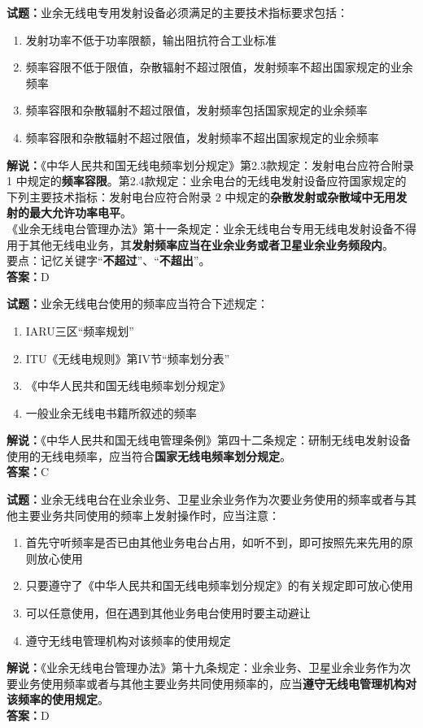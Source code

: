 \documentclass{ctexbook}
\begin{document}
\bigskip

\noindent\textbf{试题：}业余无线电专用发射设备必须满足的主要技术指标要求包括：
\begin{enumerate}[leftmargin=3em]
  \item 发射功率不低于功率限额，输出阻抗符合工业标准
  \item 频率容限不低于限值，杂散辐射不超过限值，发射频率不超出国家规定的业余频率
  \item 频率容限和杂散辐射不超过限值，发射频率包括国家规定的业余频率
  \item 频率容限和杂散辐射不超过限值，发射频率不超出国家规定的业余频率
\end{enumerate}
\noindent\textbf{解说：}《中华人民共和国无线电频率划分规定》第2.3款规定：发射电台应符合附录 1 中规定的\textbf{频率容限}。第2.4款规定：业余电台的无线电发射设备应符国家规定的下列主要技术指标：发射电台应符合附录 2 中规定的\textbf{杂散发射或杂散域中无用发射的最大允许功率电平}。\\《业余无线电台管理办法》第十一条规定：业余无线电台专用无线电发射设备不得用于其他无线电业务，其\textbf{发射频率应当在业余业务或者卫星业余业务频段内}。\\要点：记忆关键字“\textbf{不超过}”、“\textbf{不超出}”。\\\noindent\textbf{答案：}D

\bigskip

\noindent\textbf{试题：}业余无线电台使用的频率应当符合下述规定：
\begin{enumerate}[leftmargin=3em]
  \item IARU三区“频率规划”
  \item ITU《无线电规则》第IV节“频率划分表”
  \item 《中华人民共和国无线电频率划分规定》
  \item 一般业余无线电书籍所叙述的频率
\end{enumerate}
\noindent\textbf{解说：}《中华人民共和国无线电管理条例》第四十二条规定：研制无线电发射设备使用的无线电频率，应当符合\textbf{国家无线电频率划分规定}。\\\noindent\textbf{答案：}C

\bigskip

\noindent\textbf{试题：}业余无线电台在业余业务、卫星业余业务作为次要业务使用的频率或者与其他主要业务共同使用的频率上发射操作时，应当注意：
\begin{enumerate}[leftmargin=3em]
  \item 首先守听频率是否已由其他业务电台占用，如听不到，即可按照先来先用的原则放心使用
  \item 只要遵守了《中华人民共和国无线电频率划分规定》的有关规定即可放心使用
  \item 可以任意使用，但在遇到其他业务电台使用时要主动避让
  \item 遵守无线电管理机构对该频率的使用规定
\end{enumerate}
\noindent\textbf{解说：}《业余无线电台管理办法》第十九条规定：业余业务、卫星业余业务作为次要业务使用频率或者与其他主要业务共同使用频率的，应当\textbf{遵守无线电管理机构对该频率的使用规定}。\\\noindent\textbf{答案：}D
\end{document}
